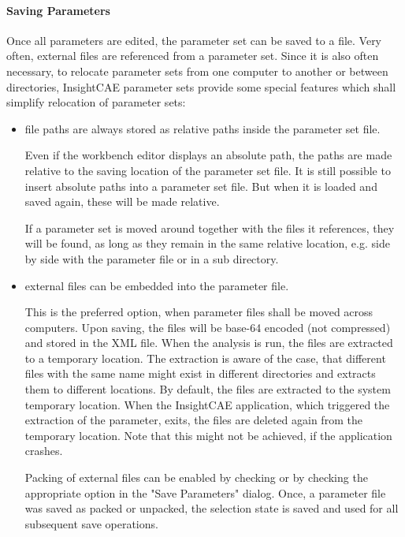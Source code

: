 \paragraph{Saving Parameters}
\label{par:save_parameters}
Once all parameters are edited, the parameter set can be saved to a file.
Very often, external files are referenced from a parameter set.
Since it is also often necessary, to relocate parameter sets from one computer to another or between directories, InsightCAE parameter sets provide some special features which shall simplify relocation of parameter sets:
\begin{itemize}
\item file paths are always stored as relative paths inside the parameter set file.

Even if the workbench editor displays an absolute path, the paths are made relative to the saving location of the parameter set file. It is still possible to insert absolute paths into a parameter set file. But when it is loaded and saved again, these will be made relative.

If a parameter set is moved around together with the files it references, they will be found, as long as they remain in the same relative location, e.g. side by side with the parameter file or in a sub directory.

\item external files can be embedded into the parameter file.

This is the preferred option, when parameter files shall be moved across computers. Upon saving, the files will be base-64 encoded (not compressed) and stored in the XML file.
When the analysis is run, the files are extracted to a temporary location.
The extraction is aware of the case, that different files with the same name might exist in different directories and extracts them to different locations.
By default, the files are extracted to the system temporary location.
When the InsightCAE application, which triggered the extraction of the parameter, exits, the files are deleted again from the temporary location. Note that this might not be achieved, if the application crashes.

Packing of external files can be enabled by checking  or by checking the appropriate option in the "Save Parameters" dialog.
Once, a parameter file was saved as packed or unpacked, the selection state is saved and used for all subsequent save operations.

\end{itemize}

